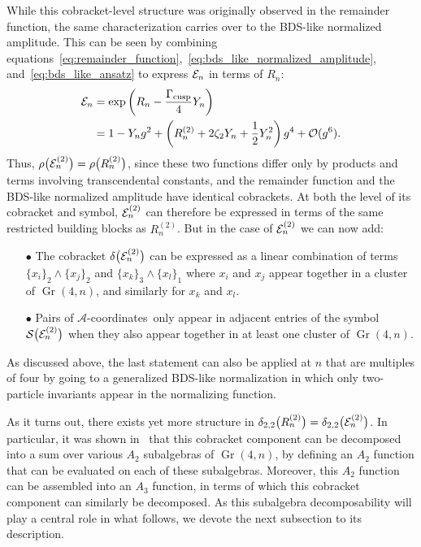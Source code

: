 \documentclass[12pt]{article}
\DeclareMathOperator{\Gr}{Gr}
\def\acoords{$\mathcal{A}$-coordinates}
\begin{document}
While this cobracket-level structure was originally observed in the remainder function, the same characterization carries over to the BDS-like normalized amplitude. This can be seen by combining equations~\eqref{eq:remainder_function},~\eqref{eq:bds_like_normalized_amplitude}, and~\eqref{eq:bds_like_ansatz} to express ${\cal E}_n$ in terms of $R_n$:
\begin{align}
{\cal E}_n &= \exp \left(R_n- \frac{\Gamma_{\text{cusp}}}{4} Y_n \right) \\
&= 1 - Y_n g^2 + \left(R_n^{(2)} + 2 \zeta_2 Y_n + \frac{1}{2} Y_n^2 \right) g^4 + \mathcal{O}(g^6). \nonumber
\end{align} 
Thus, $\rho \big({\cal E}_n^{(2)}\big) = \rho \big(R_n^{(2)} \big)$, since these two functions differ only by products and terms involving transcendental constants, and the remainder function and the BDS-like normalized amplitude have identical cobrackets. At both the level of its cobracket and symbol, ${\cal E}^{(2)}_n$ can therefore be expressed in terms of the same restricted building blocks as $R^{(2)}_n$. But in the case of ${\cal E}^{(2)}_n$ we can now add:
\begin{itemize}
\item[$\bullet$] The cobracket $\delta\big({\cal E}^{(2)}_n\big)$ can be expressed as a linear combination of terms $\{x_i\}_2 \wedge \{x_j\}_2$ and $\{x_k\}_3 \wedge \{x_l \}_1$ where $x_i$ and $x_j$ appear together in a cluster of $\Gr(4,n)$, and similarly for $x_k$ and $x_l$. 
\item[$\bullet$] Pairs of \acoords\ only appear in adjacent entries of the symbol ${\cal S} \big({\cal E}^{(2)}_n\big)$ when they also appear together in at least one cluster of $\Gr(4,n)$.
\end{itemize}
As discussed above, the last statement can also be applied at $n$ that are multiples of four by going to a generalized BDS-like normalization in which only two-particle invariants appear in the normalizing function.

As it turns out, there exists yet more structure in $\delta_{2,2}\big(R^{(2)}_n\big) = \delta_{2,2}\big({\cal E}^{(2)}_n\big)$. In particular, it was shown in~\cite{Golden:2014xqa} that this cobracket component can be decomposed into a sum over various $A_2$ subalgebras of $\Gr(4,n)$, by defining an $A_2$ function that can be evaluated on each of these subalgebras. Moreover, this $A_2$ function can be assembled into an $A_3$ function, in terms of which this cobracket component can similarly be decomposed. As this subalgebra decomposability will play a central role in what follows, we devote the next subsection to its description.
\end{document}
